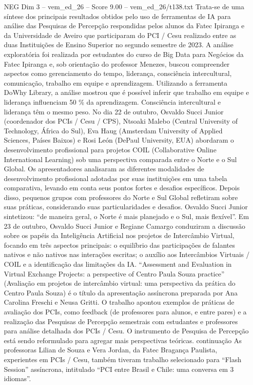 \begin{textsample}{NEG Dim 3 – vem\_ed\_26 – Score 9.00 – vem\_ed\_26/t138.txt}
Trata-se de uma síntese dos principais resultados obtidos pelo uso de ferramentas de IA para análise das Pesquisas de Percepção respondidas pelos alunos da Fatec Ipiranga e da Universidade de Aveiro que participaram do PCI / Cesu realizado entre as duas Instituições de Ensino Superior no segundo semestre de 2023.
A análise exploratória foi realizada por estudantes do curso de Big Data para Negócios da Fatec Ipiranga e, sob orientação do professor Menezes, buscou compreender aspectos como gerenciamento do tempo, liderança, consciência intercultural, comunicação, trabalho em equipe e aprendizagem.
Utilizando a ferramenta DoWhy Library, a análise mostrou que é possível inferir que trabalho em equipe e liderança influenciam 50 \% da aprendizagem.
Consciência intercultural e liderança têm o mesmo peso.
No dia 22 de outubro, Osvaldo Succi Junior (coordenador dos PCIs / Cesu / CPS), Ntsoaki Malebo (Central University of Technology, África do Sul), Eva Haug (Amsterdam University of Applied Sciences, Países Baixos) e Rosi León (DePaul University, EUA) abordaram o desenvolvimento profissional para projetos COIL (Collaborative Online International Learning) sob uma perspectiva comparada entre o Norte e o Sul Global.
Os apresentadores analisaram as diferentes modalidades de desenvolvimento profissional adotadas por suas instituições em uma tabela comparativa, levando em conta seus pontos fortes e desafios específicos.
Depois disso, pequenos grupos com professores do Norte e Sul Global refletiram sobre suas práticas, considerando suas particularidades e desafios.
Osvaldo Succi Junior sintetizou: “de maneira geral, o Norte é mais planejado e o Sul, mais flexível”.
Em 23 de outubro, Osvaldo Succi Junior e Regiane Camargo conduziram a discussão sobre os papéis da Inteligência Artificial nos projetos de Intercâmbio Virtual, focando em três aspectos principais: o equilíbrio das participações de falantes nativos e não nativos nas interações escritas; o auxílio aos Intercâmbios Virtuais / COIL e a identificação das limitações da IA. “Assessment and Evaluation in Virtual Exchange Projects: a perspective of Centro Paula Souza practice” (Avaliação em projetos de intercâmbio virtual: uma perspectiva da prática do Centro Paula Souza) é o título da apresentação assíncrona preparada por Ana Carolina Freschi e Neusa Gritti.
O trabalho apontou exemplos de práticas de avaliação dos PCIs, como feedback (de professores para alunos, e entre pares) e a realização das Pesquisas de Percepção semestrais com estudantes e professores para análise detalhada dos PCIs / Cesu.
O instrumento de Pesquisa de Percepção está sendo reformulado para agregar mais perspectivas teóricas. continuação As professoras Lilian de Souza e Vera Jordan, da Fatec Bragança Paulista, experientes em PCIs / Cesu, também tiveram trabalho selecionado para “Flash Session” assíncrona, intitulado “PCI entre Brasil e Chile: uma conversa em 3 idiomas”.

\end{textsample}
